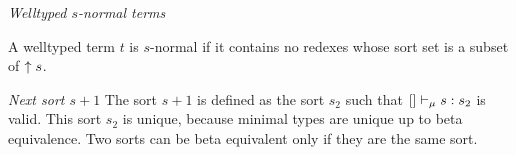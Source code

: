 \begin{definition}
    \label{def:INormalTerm}
    \emph{Welltyped $s$-normal terms}

    A welltyped term $t$ is $s$-normal if it contains no redexes whose sort set
    is a subset of ${\uparrow s}$.
\end{definition}


\begin{definition}
    \emph{Next sort $s+1$}
    The sort $s + 1$ is defined as the sort $s_2$ such that $[] \vdash_\mu s:
    s_2$ is valid. This sort $s_2$ is unique, because minimal types are unique
    up to beta equivalence. Two sorts can be beta equivalent only if they are
    the same sort.
\end{definition}



